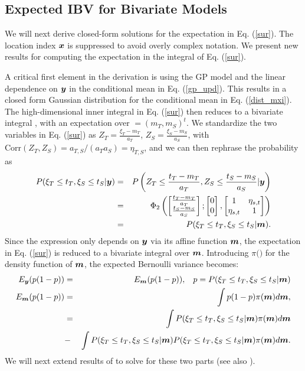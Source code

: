 \documentclass[aoas]{imsart}
\begin{document}
\subsection{Expected IBV for Bivariate Models}

We will next derive closed-form solutions for the expectation in Eq. (\ref{sur}). The location index ${\boldsymbol x}$ is suppressed to avoid overly
complex notation. We present new results for computing the expectation in the integral of
Eq. (\ref{sur}).

A critical first element in the derivation is using the GP model and the
linear dependence on ${\boldsymbol y}$ in the conditional mean in
Eq. (\ref{gp_upd}). This results in a closed form Gaussian
distribution for the conditional mean in Eq. (\ref{dist_mxi}). The
high-dimensional inner integral in Eq. (\ref{sur}) then reduces to a
bivariate integral \citep{bhattacharjya2013value, chevalier2014fast},
with an expectation over $\bm=(m_{T},m_{S})^t$.  We standardize the two
variables in Eq. (\ref{sur}) as   $Z_T=\frac{\xi_T-m_{T}}{a_{T}}$,
$Z_S=\frac{\xi_S-m_{S}}{a_{S}}$, with $\mbox{Corr}(Z_T,Z_S)=a_{T,S}/(a_{T} a_{S})=\eta_{T,S}$, and we can then rephrase the probability as
\begin{eqnarray}\label{ytom}
   P(\xi_T \leq t_T, \xi_S \leq t_S|\by) &=& P \left( Z_T \leq\frac{t_T-m_{T}}{a_{T}}, Z_S \leq\frac{t_S-m_{S}}{a_{S}}|\by \right) \nonumber \\
   &=& \Phi_2 \begin{pmatrix} 
\begin{bmatrix} \frac{t_T-m_{T}}{a_{T}}\\
\frac{t_S-m_{S}}{a_{S}}
\end{bmatrix};
 \begin{bmatrix} 0\\
0
\end{bmatrix},\begin{bmatrix}
1 & \eta_{s,t}  \\
\eta_{s,t}   & 1  
\end{bmatrix}\end{pmatrix} \nonumber \\
&=& P(\xi_T \leq t_T, \xi_S \leq t_S|\bm).
\end{eqnarray}
Since the expression only depends on ${\boldsymbol y}$ via its affine function ${\boldsymbol m}$, the expectation in Eq. (\ref{sur}) is reduced to a bivariate integral over ${\boldsymbol m}$. 
Introducing $\pi(\bm)$ for the density
function of ${\boldsymbol m}$, the expected Bernoulli variance becomes:
\begin{eqnarray}\label{eq:var2}
E_{\by}(p(1-p)) &=& E_{\bm}(p(1-p)), \hspace{3mm} p=P(\xi_T \leq t_T, \xi_S \leq t_S|\bm) \nonumber \\
E_{\bm}(p(1-p)) & = & \int p(1-p) \pi(\bm) d\bm, \nonumber \\
 &=& \int P(\xi_T \leq t_T, \xi_S \leq t_S|\bm)  \pi(\bm) d\bm \nonumber  \\
&-& \int P(\xi_T \leq t_T, \xi_S \leq t_S|\bm) P(\xi_T \leq t_T, \xi_S \leq t_S|\bm) \pi(\bm) d\bm. 
\end{eqnarray}
We will next extend results of \cite{chevalier2014fast} to solve for
these two parts (see also \cite{stroh}).
\end{document}
